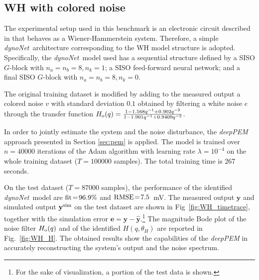 \documentclass{article}
\newcommand{\q}{q} %
\newcommand{\tvec}[1]{\mathbf{#1}}
\newcommand{\nsamp}{T}
\newcommand{\simul}{{\rm sim}}
\newcommand{\Name}{\emph{dynoNet}}
\begin{document}
\subsection{WH with colored noise}

The experimental setup used in this benchmark is an electronic circuit described in \cite{ljung2009wiener} that behaves as a Wiener-Hammerstein system. Therefore, a simple \Name\ architecture corresponding to the WH model structure is adopted. Specifically, the \Name\ model used has a sequential structure defined by a SISO $G$-block with $n_a = n_b = 8, n_k=1$; a SISO feed-forward neural network; and a final SISO $G$-block with $n_a = n_b = 8, n_k=0$. 

The original training dataset is modified by adding to the measured output 
a colored noise $v$ with standard deviation $0.1$ obtained by filtering a white noise $e$ through the transfer function 
$H_{\rm o}(\q) = \frac{1 - 1.568\q^{-1} + 0.902\q^{-2}}{1 - 1.901 \q^{-1} + 0.9409\q^{-2}}$.

In order to jointly estimate the system and the noise disturbance, the \emph{deepPEM} approach presented in Section 
\ref{sec:pem} is applied.
 The model is trained over $n=40000$ iterations of the Adam algorithm with learning rate $\lambda=10^{-4}$ on the whole training dataset ($\nsamp=100000$ samples). The total training time is 267 seconds. 
  

On the test dataset ($\nsamp=87000$ samples), the performance of the identified \Name \ model    are $\rm fit\!=\!96.9\%$ and $\rm{RMSE}\!=\!7.5$~mV. 
The measured output $\tvec{y}$ and simulated output $\tvec{y}^{\simul}$ on the test dataset are shown in Fig~\ref{fig:WH_timetrace}, together with the simulation error $\tvec{e} = \tvec{y}\! -\! \hat{\tvec{y}}$.\footnote{
For the sake of visualization,   a portion of the test data is shown.}
The magnitude Bode plot of the noise filter $H_{\rm o}(q)$ and of the identified $H(q,  \theta_H)$ are reported in Fig.~\ref{fig:WH_H}. The obtained results  show the capabilities of the \emph{deepPEM} in accurately reconstructing the system's output and the noise spectrum.
\end{document}
